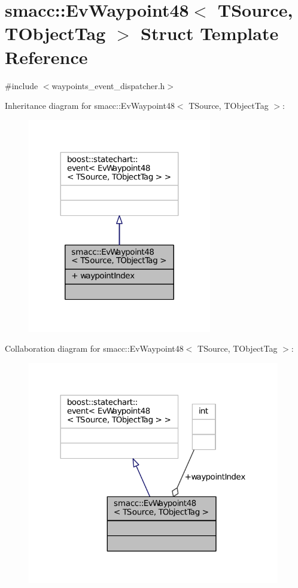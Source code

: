 \hypertarget{structsmacc_1_1EvWaypoint48}{}\section{smacc\+:\+:Ev\+Waypoint48$<$ T\+Source, T\+Object\+Tag $>$ Struct Template Reference}
\label{structsmacc_1_1EvWaypoint48}


{\ttfamily \#include $<$waypoints\+\_\+event\+\_\+dispatcher.\+h$>$}



Inheritance diagram for smacc\+:\+:Ev\+Waypoint48$<$ T\+Source, T\+Object\+Tag $>$\+:
\nopagebreak
\begin{figure}[H]
\begin{center}
\leavevmode
\includegraphics[width=227pt]{structsmacc_1_1EvWaypoint48__inherit__graph}
\end{center}
\end{figure}


Collaboration diagram for smacc\+:\+:Ev\+Waypoint48$<$ T\+Source, T\+Object\+Tag $>$\+:
\nopagebreak
\begin{figure}[H]
\begin{center}
\leavevmode
\includegraphics[width=312pt]{structsmacc_1_1EvWaypoint48__coll__graph}
\end{center}
\end{figure}
